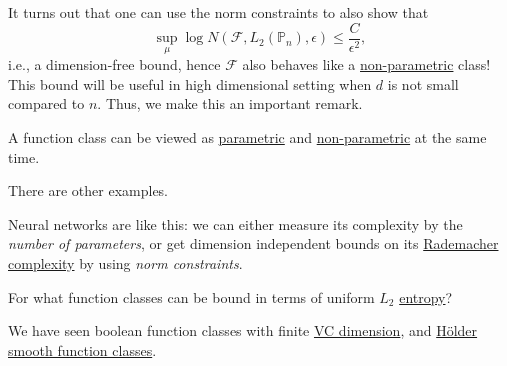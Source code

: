It turns out that one can use the norm constraints to also show that
\[
	\sup _\mu \log N(\mathscr{F} , L_2(\mathbb{P} _n), \epsilon ) \leq \frac{C}{\epsilon ^2},
\]
i.e., a dimension-free bound, hence \(\mathscr{F} \) also behaves like a \hyperref[def:non-parametric]{non-parametric} class! This bound will be useful in high dimensional setting when \(d\) is not small compared to \(n\). Thus, we make this an important remark.

\begin{remark}
	A function class can be viewed as \hyperref[def:parametric]{parametric} and \hyperref[def:non-parametric]{non-parametric} at the same time.
\end{remark}

There are other examples.

\begin{eg}
	Neural networks are like this: we can either measure its complexity by the \emph{number of parameters}, or get dimension independent bounds on its \hyperref[def:Rademacher-complexity]{Rademacher complexity} by using \emph{norm constraints}.
\end{eg}

\begin{problem*}
	For what function classes can be bound in terms of uniform \(L_2\) \hyperref[def:metric-entropy]{entropy}?
\end{problem*}
\begin{answer}
	We have seen boolean function classes with finite \hyperref[def:VC-dimension]{VC dimension}, and \hyperref[def:Holder-smooth-function-class]{Hölder smooth function classes}.
\end{answer}